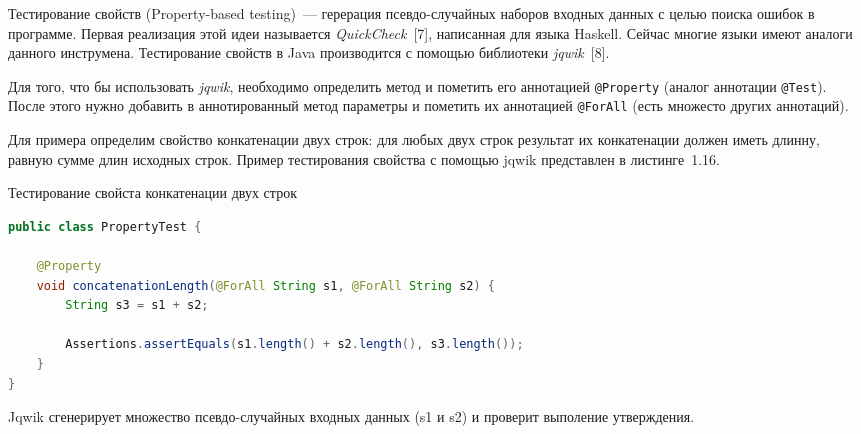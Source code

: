 Тестирование свойств (Property-based testing)~--- герерация псевдо-случайных наборов входных данных с целью поиска ошибок в программе. Первая реализация этой идеи называется \textit{QuickCheck}~[7], написанная для языка Haskell. Сейчас многие языки имеют аналоги данного инструмена. Тестирование свойств в Java производится с помощью библиотеки \textit{jqwik}~[8].

Для того, что бы использовать \textit{jqwik}, необходимо определить метод и пометить его аннотацией \texttt{@Property} (аналог аннотации \texttt{@Test}). После этого нужно добавить в аннотированный метод параметры и пометить их аннотацией \texttt{@ForAll} (есть множесто других аннотаций). 

Для примера определим свойство конкатенации двух строк: для любых двух строк результат их конкатенации должен иметь длинну, равную сумме длин исходных строк. Пример тестирования свойства с помощью jqwik представлен в листинге~1.16.

\begin{ListingEnv}[!h]%
	\captiondelim{ } %
	\caption{Тестирование свойста конкатенации двух строк}
	\begin{lstlisting}[language={Java}]
public class PropertyTest {
	
	@Property
	void concatenationLength(@ForAll String s1, @ForAll String s2) {
		String s3 = s1 + s2;
		
		Assertions.assertEquals(s1.length() + s2.length(), s3.length());
	}
}
	\end{lstlisting}
\end{ListingEnv}%

Jqwik сгенерирует множество псевдо-случайных входных данных (s1 и s2) и проверит выполение утверждения.
